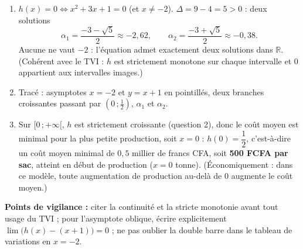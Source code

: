 \documentclass[11pt]{article}
\newcommand{\legende}[1]{\par\vspace{6pt}{\popsemi\fontsize{9}{11.5}\selectfont\color{popmuted}#1}}
\begin{document}
\begin{corrige}
\begin{enumerate}
\item $h(x)=0 \iff x^2+3x+1=0$ (et $x\neq -2$). $\Delta=9-4=5>0$ : deux solutions
\[ \alpha_1=\frac{-3-\sqrt{5}}{2}\approx -2{,}62,\qquad \alpha_2=\frac{-3+\sqrt{5}}{2}\approx -0{,}38. \]
Aucune ne vaut $-2$ : l'équation admet exactement deux solutions dans $\mathbb{R}$. (Cohérent avec le TVI : $h$ est strictement monotone sur chaque intervalle et $0$ appartient aux intervalles images.)

\item Tracé : asymptotes $x=-2$ et $y=x+1$ en pointillés, deux branches croissantes passant par $(0\,;\frac{1}{2})$, $\alpha_1$ et $\alpha_2$.
\begin{popfigure}
\legende{Courbe $\mathcal{C}_h$ et ses deux asymptotes}
\end{popfigure}

\item Sur $[0\,;+\infty[$, $h$ est strictement croissante (question 2), donc le coût moyen est minimal pour la plus petite production, soit $x=0$ : $h(0)=\dfrac{1}{2}$, c'est-à-dire un coût moyen minimal de $0{,}5$ millier de francs CFA, soit \textbf{500 FCFA par sac}, atteint en début de production ($x=0$ tonne). (Économiquement : dans ce modèle, toute augmentation de production au-delà de $0$ augmente le coût moyen.)
\end{enumerate}
\textbf{Points de vigilance :} citer la continuité et la stricte monotonie avant tout usage du TVI ; pour l'asymptote oblique, écrire explicitement $\lim\big(h(x)-(x+1)\big)=0$ ; ne pas oublier la double barre dans le tableau de variations en $x=-2$.
\end{corrige}
\end{document}
